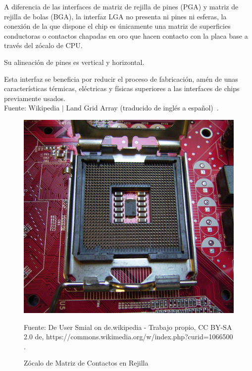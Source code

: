 \documentclass[conference]{IEEEtran}
\begin{document}
    \begin{displayquote}
        A diferencia de las interfaces de matriz de rejilla de pines (PGA) y
        matriz de rejilla de bolas (BGA), la interfaz LGA no presenta ni
        pines ni esferas, la conexión de la que dispone el chip es únicamente
        una matriz de superficies conductoras o contactos chapadas en oro que
        hacen contacto con la placa base a través del zócalo de CPU.

        \bigbreak

        Su alineación de pines es vertical y horizontal.

        \bigbreak

        Esta interfaz se beneficia por reducir el proceso de fabricación,
        amén de unas características térmicas, eléctricas y físicas
        superiores a las interfaces de chips previamente usados.\\
        \small
        Fuente: Wikipedia $\mid$ Land Grid Array (traducido de inglés a
        español)~\cite{wikipedia-lga-2021D}.
    \end{displayquote}

    \begin{figure}[H]
        \centering
        \includegraphics[width=0.2\paperwidth]{images/lga-socket}
        \caption{Zócalo de Matriz de Contactos en Rejilla} \footnotesize
        Fuente: De User Smial on de.wikipedia - Trabajo propio, CC BY-SA 2.0
        de, https://commons.wikimedia.org/w/index.php?curid=1066500
        \cite{wikipedia-lga-2021D}.\label{fig:figure2}
    \end{figure}
\end{document}
